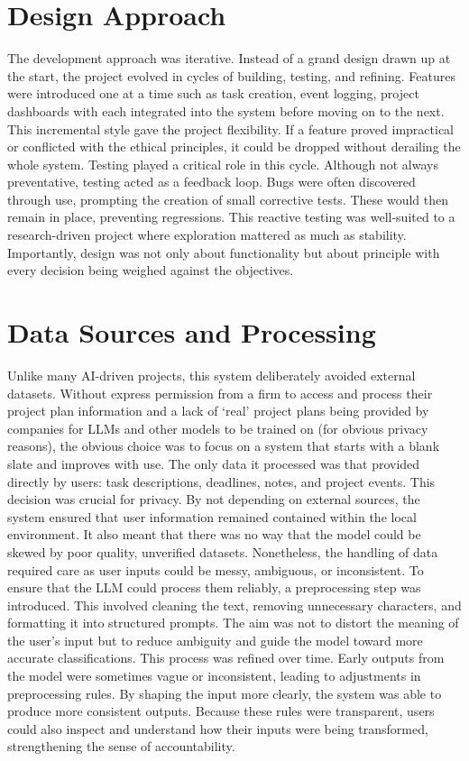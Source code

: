 \documentclass{report}
\begin{document}
\section{Design Approach}

The development approach was iterative. 
Instead of a grand design drawn up at the start, the project evolved in cycles of building, testing, and refining. 
Features were introduced one at a time such as task creation, event logging, project dashboards with each integrated into the system before moving on to the next. 
This incremental style gave the project flexibility. 
If a feature proved impractical or conflicted with the ethical principles, it could be dropped without derailing the whole system.
Testing played a critical role in this cycle. Although not always preventative, testing acted as a feedback loop. 
Bugs were often discovered through use, prompting the creation of small corrective tests. 
These would then remain in place, preventing regressions. 
This reactive testing was well-suited to a research-driven project where exploration mattered as much as stability.
Importantly, design was not only about functionality but about principle with every decision being weighed against the objectives. 

\section{Data Sources and Processing}

Unlike many AI-driven projects, this system deliberately avoided external datasets. 
Without express permission from a firm to access and process their project plan information and a lack of `real' project plans being provided by companies for LLMs and other models to be trained on (for obvious privacy reasons), the obvious choice was to focus on a system that starts with a blank slate and improves with use.
The only data it processed was that provided directly by users: task descriptions, deadlines, notes, and project events. 
This decision was crucial for privacy. 
By not depending on external sources, the system ensured that user information remained contained within the local environment.
It also meant that there was no way that the model could be skewed by poor quality, unverified datasets. 
Nonetheless, the handling of data required care as user inputs could be messy, ambiguous, or inconsistent. 
To ensure that the LLM could process them reliably, a preprocessing step was introduced. 
This involved cleaning the text, removing unnecessary characters, and formatting it into structured prompts. 
The aim was not to distort the meaning of the user's input but to reduce ambiguity and guide the model toward more accurate classifications.
This process was refined over time. Early outputs from the model were sometimes vague or inconsistent, leading to adjustments in preprocessing rules. 
By shaping the input more clearly, the system was able to produce more consistent outputs. 
Because these rules were transparent, users could also inspect and understand how their inputs were being transformed, strengthening the sense of accountability.
\end{document}
